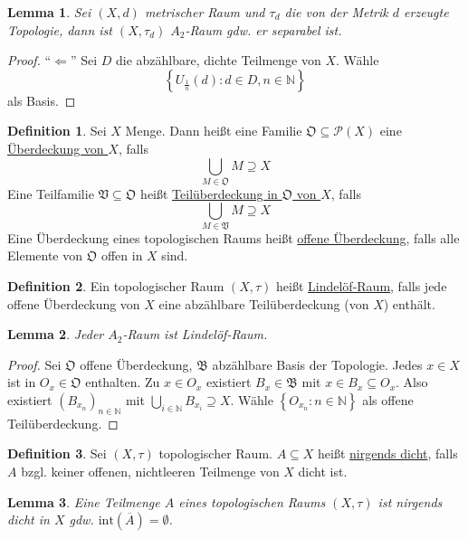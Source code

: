 \documentclass[12pt]{scrartcl}%
\newtheorem{lemma}{Lemma}
\theoremstyle{definition}
\newtheorem*{defn}{Definition}
\theoremstyle{remark}
\newcommand{\powerset}{\mathcal{P}}
\newcommand{\interior}{\text{int}}
\newcommand{\AR}[1]{$A_#1$-Raum}
\begin{document}
\begin{lemma}
    Sei $(X,d)$ metrischer Raum und $\tau_d$ die von der Metrik $d$ erzeugte Topologie, dann ist $(X,\tau_d)$ \AR{2} gdw. er separabel ist.
\end{lemma}

\begin{proof}
    \enquote{$\Leftarrow$} Sei $D$ die abzählbare, dichte Teilmenge von $X$. Wähle $$\left\{ U_{\frac 1 n}(d): d\in D, n\in \mathbb N \right\}$$ als Basis.
\end{proof}

\begin{defn}
    Sei $X$ Menge. Dann heißt eine Familie $\mathfrak{O} \subseteq \powerset(X)$ eine \underline{Überdeckung von $X$}, falls $$\bigcup_{M\in\mathfrak{O}} M \supseteq X$$ Eine Teilfamilie $\mathfrak{V} \subseteq \mathfrak{O}$ heißt \underline{Teilüberdeckung in $\mathfrak{O}$ von $X$}, falls $$\bigcup_{M\in\mathfrak{V}} M \supseteq X$$ Eine Überdeckung eines topologischen Raums heißt \underline{offene Überdeckung}, falls alle Elemente von $\mathfrak{O}$ offen in $X$ sind.
\end{defn}

\begin{defn}
    Ein topologischer Raum $(X,\tau)$ heißt \underline{Lindelöf-Raum}, falls jede offene Überdeckung von $X$ eine abzählbare Teilüberdeckung (von $X$) enthält.
\end{defn}

\begin{lemma}
    Jeder \AR{2} ist Lindelöf-Raum.
\end{lemma}

\begin{proof}
    Sei $\mathfrak{O}$ offene Überdeckung, $\mathfrak{B}$ abzählbare Basis der Topologie. Jedes $x\in X$ ist in $O_x\in\mathfrak{O}$ enthalten. Zu $x\in O_x$ existiert $B_x\in\mathfrak{B}$ mit $x\in B_x\subseteq O_x$. Also existiert $(B_{x_n})_{n\in\mathbb{N}}$ mit $\bigcup_{i\in\mathbb{N}} B_{x_i} \supseteq X$. Wähle $\left\{ O_{x_n}: n\in\mathbb{N} \right\}$ als offene Teilüberdeckung.
\end{proof}

\begin{defn}
    Sei $(X,\tau)$ topologischer Raum. $A\subseteq X$ heißt \underline{nirgends dicht}, falls $A$ bzgl. keiner offenen, nichtleeren Teilmenge von $X$ dicht ist.
\end{defn}

\begin{lemma}
    Eine Teilmenge $A$ eines topologischen Raums $(X,\tau)$ ist nirgends dicht in $X$ gdw. $\interior(\overline{A})=\emptyset$.
\end{lemma}
\end{document}
